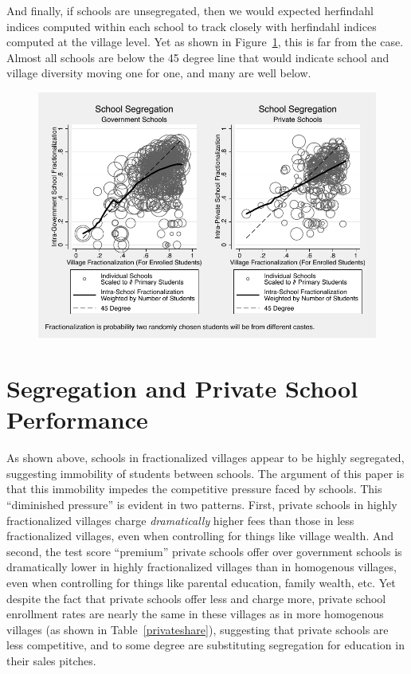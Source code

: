 \documentclass[12pt]{article}
\begin{document}
And finally, if schools are unsegregated, then we would expected herfindahl indices computed within each school to track closely with herfindahl indices computed at the village level. Yet as shown in Figure~\ref{schoolvvillageherf}, this is far from the case. Almost all schools are below the 45 degree line that would indicate school and village diversity moving one for one, and many are well below. 


\begin{figure}[H]
	\begin{center}
	\caption{}\label{schoolvvillageherf}
	\includegraphics[scale=1.0]{graphs/intra_versus_intervillage_frac_combined.pdf}
	\end{center}
\end{figure}

\pagebreak
\pagebreak

\section{Segregation and Private School Performance}\label{performance}
As shown above, schools in fractionalized villages appear to be highly segregated, suggesting immobility of students between schools. The argument of this paper is that this immobility impedes the competitive pressure faced by schools. This ``diminished pressure'' is evident in two patterns. First, private schools in highly fractionalized villages charge \emph{dramatically} higher fees than those in less fractionalized villages, even when controlling for things like village wealth. And second, the test score ``premium'' private schools offer over government schools is dramatically lower in highly fractionalized villages than in homogenous villages, even when controlling for things like parental education, family wealth, etc. Yet despite the fact that private schools offer less and charge more, private school enrollment rates are nearly the same in these villages as in more homogenous villages (as shown in Table~\ref{privateshare}), suggesting that private schools are less competitive, and to some degree are substituting segregation for education in their sales pitches.
\end{document}

